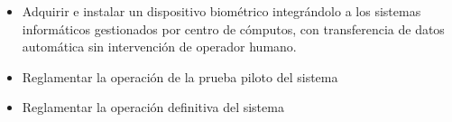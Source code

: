\documentclass[a4paper, 11pt]{article} %
\begin{document}
\begin{itemize}
	\item Adquirir e instalar un dispositivo biométrico integrándolo a los sistemas informáticos gestionados por centro de cómputos, con transferencia de datos automática sin intervención de operador humano.
	\item Reglamentar la operación de la prueba piloto del sistema
	\item Reglamentar la operación definitiva del sistema
\end{itemize}
\end{document}
